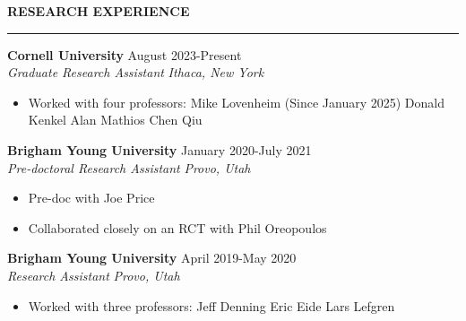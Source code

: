 \documentclass[11pt]{article}
\newenvironment{rSection}[1]{
  \vspace{1.5em}
  \noindent\textbf{\MakeUppercase{#1}}
  \vspace{0.2em}\hrule\vspace{0.5em}
}{}
\newenvironment{rSubsection}[4]{
  \noindent\textbf{#1} \hfill #2 \\
  \textit{#3} \hfill \textit{#4}
  \begin{itemize}[leftmargin=1.5em, itemsep=-0.2em, topsep=0pt, parsep=0pt]
}{
  \end{itemize}
  \vspace{0.5em}
}
\begin{document}

\begin{rSection}{Research Experience}

\begin{rSubsection}{Cornell University}{August 2023-Present}{Graduate Research Assistant}{Ithaca, New York}
    \item Worked with four professors:
    \subitem Mike Lovenheim (Since January 2025)
    \subitem Donald Kenkel
    \subitem Alan Mathios
    \subitem Chen Qiu
\end{rSubsection}

\begin{rSubsection}{Brigham Young University}{January 2020-July 2021}{Pre-doctoral Research Assistant}{Provo, Utah}
    \item Pre-doc with Joe Price
    \item Collaborated closely on an RCT with Phil Oreopoulos
\end{rSubsection}

\begin{rSubsection}{Brigham Young University}{April 2019-May 2020}{Research Assistant}{Provo, Utah}
    \item Worked with three professors:
    \subitem Jeff Denning
    \subitem Eric Eide
    \subitem Lars Lefgren
\end{rSubsection}

\end{rSection}

\end{document}
